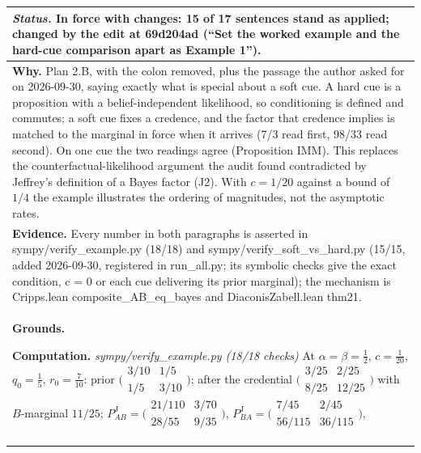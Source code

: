 \documentclass[10pt]{article}
\theoremstyle{definition}
\newcommand{\PJ}{P^{\mathrm{J}}}
\newlength{\fullw}\setlength{\fullw}{25.9cm}
\begin{document}
{\begin{longtable}{|p{0.9cm}|p{12.2cm}|p{12.2cm}|}
\multicolumn{3}{|p{\fullw}|}{\textit{Status.} In force with changes: 15 of 17 sentences stand as applied; changed by the edit at 69d204ad (``Set the worked example and the hard-cue comparison apart as Example 1'').} \\ \hline
\multicolumn{3}{|p{\fullw}|}{\textbf{Why.} Plan 2.B, with the colon removed, plus the passage the author asked for on 2026-09-30, saying exactly what is special about a soft cue. A hard cue is a proposition with a belief-independent likelihood, so conditioning is defined and commutes; a soft cue fixes a credence, and the factor that credence implies is matched to the marginal in force when it arrives (7/3 read first, 98/33 read second). On one cue the two readings agree (Proposition IMM). This replaces the counterfactual-likelihood argument the audit found contradicted by Jeffrey's definition of a Bayes factor (J2). With $c=1/20$ against a bound of $1/4$ the example illustrates the ordering of magnitudes, not the asymptotic rates.} \\
\multicolumn{3}{|p{\fullw}|}{\textbf{Evidence.} Every number in both paragraphs is asserted in sympy/verify\_example.py (18/18) and sympy/verify\_soft\_vs\_hard.py (15/15, added 2026-09-30, registered in run\_all.py; its symbolic checks give the exact condition, c = 0 or each cue delivering its prior marginal); the mechanism is Cripps.lean composite\_AB\_eq\_bayes and DiaconisZabell.lean thm21.} \\ \hline
\multicolumn{3}{|p{\fullw}|}{\textbf{Grounds.}\par \textbf{Computation.} \textit{sympy/verify\_example.py (18/18 checks)} \newline At $\alpha=\beta=\tfrac12$, $c=\tfrac1{20}$, $q_0=\tfrac15$, $r_0=\tfrac7{10}$:
prior $\bigl(\begin{smallmatrix}3/10&1/5\\1/5&3/10\end{smallmatrix}\bigr)$; after the
credential $\bigl(\begin{smallmatrix}3/25&2/25\\8/25&12/25\end{smallmatrix}\bigr)$ with
$B$-marginal $11/25$;
$\PJ_{AB}=\bigl(\begin{smallmatrix}21/110&3/70\\28/55&9/35\end{smallmatrix}\bigr)$,
$\PJ_{BA}=\bigl(\begin{smallmatrix}7/45&2/45\\56/115&36/115\end{smallmatrix}\bigr)$,
}
\end{longtable}}
\end{document}
